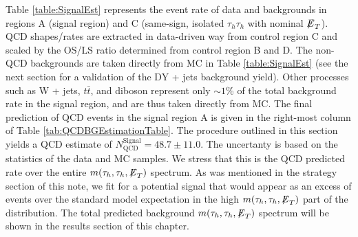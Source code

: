          
Table \ref{table:SignalEst} represents the event rate of data and backgrounds in regions A (signal region) and C (same-sign, isolated $\tau_{h}\tau_{h}$ with nominal ${\not\mathrel{E}}_T$). QCD 
shapes/rates are extracted in data-driven way from control region C and scaled by the OS/LS ratio determined from control region B and D. The non-QCD 
backgrounds are taken directly from MC in Table \ref{table:SignalEst} (see the next section for a validation of the DY + jets background yield). Other processes such as W + jets, 
$t\bar{t}$, and diboson represent only $\sim 1$\% of the total background 
rate in the signal region, and are thus taken directly from MC. The final prediction of QCD events in the signal region A is given in the right-most column of 
Table \ref{tab:QCDBGEstimationTable}. The procedure outlined in this section yields a QCD estimate of $N_{\textrm{QCD}}^{\textrm{Signal}} = 48.7 \pm 11.0$. The uncertanty is based on the 
statistics of the data and MC samples. We stress that this is the QCD predicted rate over the entire $m(\tau_{h},\tau_{h},{\not\mathrel{E}}_T)$ spectrum. As was mentioned
in the strategy section of this note, we fit for a potential signal that would appear as an excess of events over the standard model expectation in the high 
$m(\tau_{h},\tau_{h},{\not\mathrel{E}}_T)$ part of the distribution. The total predicted background $m(\tau_{h},\tau_{h},{\not\mathrel{E}}_T)$ spectrum will be shown in the results section of 
this chapter. 

\begin{table}[htbp!]
  \label{table:CR3table}
\end{table}

